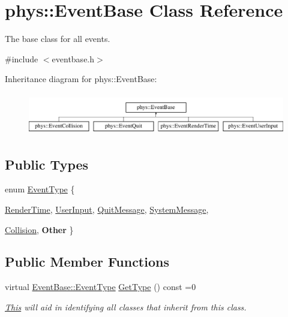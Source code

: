 \hypertarget{classphys_1_1EventBase}{
\section{phys::EventBase Class Reference}
\label{dd/d80/classphys_1_1EventBase}
}


The base class for all events.  




{\ttfamily \#include $<$eventbase.h$>$}

Inheritance diagram for phys::EventBase:\begin{figure}[H]
\begin{center}
\leavevmode
\includegraphics[height=1.84211cm]{dd/d80/classphys_1_1EventBase}
\end{center}
\end{figure}
\subsection*{Public Types}
\begin{DoxyCompactItemize}
\item 
enum \hyperlink{classphys_1_1EventBase_a5e6a8564e127f654123f0bf6a2751923}{EventType} \{ \par
\hyperlink{classphys_1_1EventBase_a5e6a8564e127f654123f0bf6a2751923acdfa47d279e8a1c460d557d14b85c7a5}{RenderTime}, 
\hyperlink{classphys_1_1EventBase_a5e6a8564e127f654123f0bf6a2751923a320cc0817dc2c2201501b12c50c89bef}{UserInput}, 
\hyperlink{classphys_1_1EventBase_a5e6a8564e127f654123f0bf6a2751923a84742ff55e9abdde8f5e0578d30f73a9}{QuitMessage}, 
\hyperlink{classphys_1_1EventBase_a5e6a8564e127f654123f0bf6a2751923a18594400c60af959158e9f5cc2cd5d08}{SystemMessage}, 
\par
\hyperlink{classphys_1_1EventBase_a5e6a8564e127f654123f0bf6a2751923adb6767503168d145497ef65a708725e5}{Collision}, 
{\bfseries Other}
 \}
\end{DoxyCompactItemize}
\subsection*{Public Member Functions}
\begin{DoxyCompactItemize}
\item 
virtual \hyperlink{classphys_1_1EventBase_a5e6a8564e127f654123f0bf6a2751923}{EventBase::EventType} \hyperlink{classphys_1_1EventBase_a1b3d29b6ecf30f18cc3e1825a515c508}{GetType} () const =0
\begin{DoxyCompactList}\small\item\em \hyperlink{structThis}{This} will aid in identifying all classes that inherit from this class. \item\end{DoxyCompactList}\end{DoxyCompactItemize}


